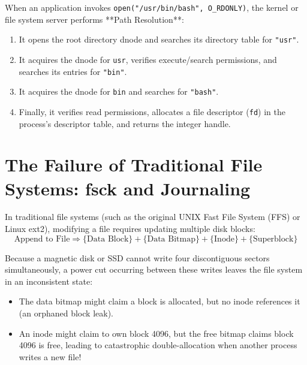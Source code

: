When an application invokes \texttt{open("/usr/bin/bash", O\_RDONLY)}, the kernel or file system server performs **Path Resolution**:
\begin{enumerate}
    \item It opens the root directory dnode and searches its directory table for \texttt{"usr"}.
    \item It acquires the dnode for \texttt{usr}, verifies execute/search permissions, and searches its entries for \texttt{"bin"}.
    \item It acquires the dnode for \texttt{bin} and searches for \texttt{"bash"}.
    \item Finally, it verifies read permissions, allocates a file descriptor (\texttt{fd}) in the process's descriptor table, and returns the integer handle.
\end{enumerate}

\section{The Failure of Traditional File Systems: fsck and Journaling}
\label{sec:failure_traditional}

In traditional file systems (such as the original UNIX Fast File System (FFS) or Linux ext2), modifying a file requires updating multiple disk blocks:
\begin{equation}
    \text{Append to File} \Longrightarrow \{\text{Data Block}\} + \{\text{Data Bitmap}\} + \{\text{Inode}\} + \{\text{Superblock}\}
\end{equation}

Because a magnetic disk or SSD cannot write four discontiguous sectors simultaneously, a power cut occurring between these writes leaves the file system in an inconsistent state:
\begin{itemize}
    \item The data bitmap might claim a block is allocated, but no inode references it (an orphaned block leak).
    \item An inode might claim to own block 4096, but the free bitmap claims block 4096 is free, leading to catastrophic double-allocation when another process writes a new file!
\end{itemize}

